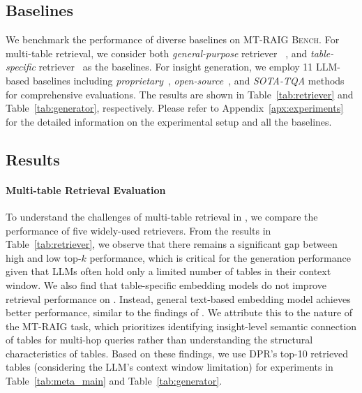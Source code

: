 \subsection{Baselines}
We benchmark the performance of diverse baselines on \textsc{MT-RAIG Bench}.
For multi-table retrieval, we consider both \textit{general-purpose} retriever ~\citep{Robertson2009ThePR,Karpukhin2020DensePR,Izacard2021UnsupervisedDI}, and \textit{table-specific} retriever~\citep{Herzig2021OpenDQ,Zhang2023TableLlamaTO} as the baselines. 
For insight generation, we employ 11 LLM-based baselines including \textit{proprietary}~\citep{O3mini,GPT4o,Claude3S}, \textit{open-source}~\citep{DeepSeekAI2025DeepSeekR1IR,Yang2024Qwen2TR,Mesnard2024GemmaOM,llama-3,Jiang2023Mistral7}, and \textit{SOTA-TQA} methods~\citep{Ye2023LargeLM,Wang2024ChainofTableET,zhao-etal-2024-tapera} for comprehensive evaluations.
The results are shown in Table~\ref{tab:retriever} and Table~\ref{tab:generator}, respectively.
Please refer to Appendix~\ref{apx:experiments} for the detailed information on the experimental setup and all the baselines.

\subsection{Results}
\paragraph{Multi-table Retrieval Evaluation} To understand the challenges of multi-table retrieval in \bench, we compare the performance of five widely-used retrievers. 
From the results in Table~\ref{tab:retriever}, we observe that there remains a significant gap between high and low top‑$k$ performance,  which is critical for the generation performance given that LLMs often hold only a limited number of tables in their context window.
We also find that table-specific embedding models do not improve retrieval performance on \bench. Instead, general text-based embedding model achieves better performance, similar to the findings of \citet{wang-etal-2022-table}. 
We attribute this to the nature of the MT-RAIG task, which prioritizes identifying insight-level semantic connection of tables for multi-hop queries rather than understanding the structural characteristics of tables.
Based on these findings, we use DPR’s top-10 retrieved tables (considering the LLM’s context window limitation) for experiments in Table~\ref{tab:meta_main} and Table~\ref{tab:generator}.

